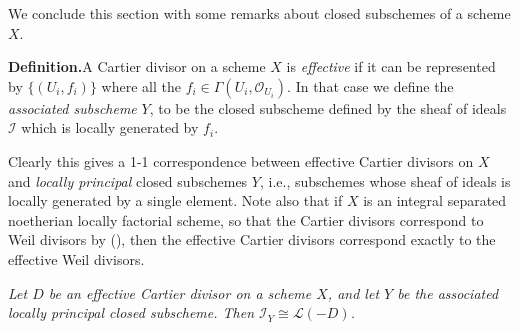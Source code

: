 {\medskip
We conclude this section with some remarks about closed subschemes\EditionText{} of a scheme $X$.

\par\smallskip\noindent\textbf{Definition.}\enspace A Cartier divisor on a scheme $X$ is \emph{effective} if it can be represented by $\{(U_i,f_i)\}$ where all the $f_i\in\Gamma(U_i,\mathcal O_{U_i})$. In that case we define the \emph{associated subscheme\EditionText{}} $Y$, to be the closed subscheme defined by the sheaf of ideals $\mathcal I$ which is locally generated by $f_i$.

 Clearly this gives a 1-1 correspondence between effective Cartier divisors on $X$ and \emph{locally principal} closed subschemes $Y$, i.e., subschemes whose sheaf of ideals is locally generated by a single element. Note also that if $X$ is an integral separated noetherian locally factorial scheme, so that the Cartier divisors correspond to Weil divisors by (), then the effective Cartier divisors correspond exactly to the effective Weil divisors.

 \emph{Let $D$ be an effective Cartier divisor on a scheme $X$, and let $Y$ be the associated locally principal closed subscheme. Then $\mathcal I_Y\cong\mathcal L(-D)$.}
}
